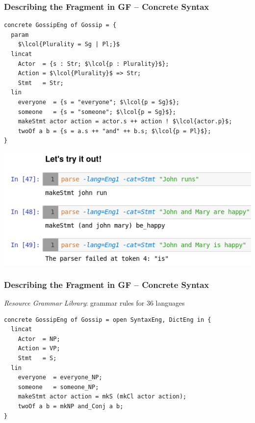 \documentclass[dvipsnames]{beamer}
\def\GF{\textsf{GF}\xspace}
\def\lcol#1{\textbf{\textcolor{NavyBlue}{#1}}}      %
\begin{document}
\begin{frame}[fragile]
    \frametitle{Describing the Fragment in \GF{} -- Concrete Syntax}

    \begin{lstlisting}[language=GF]
concrete GossipEng of Gossip = {
  param
    $\lcol{Plurality = Sg | Pl;}$
  lincat
    Actor  = {s : Str; $\lcol{p : Plurality}$};
    Action = $\lcol{Plurality}$ => Str;
    Stmt   = Str;
  lin
    everyone  = {s = "everyone"; $\lcol{p = Sg}$};
    someone   = {s = "someone"; $\lcol{p = Sg}$};
    makeStmt actor action = actor.s ++ action ! $\lcol{actor.p}$;
    twoOf a b = {s = a.s ++ "and" ++ b.s; $\lcol{p = Pl}$};
}
    \end{lstlisting}

    \includegraphics[scale=0.38]{screenshot_eng1.png}
\end{frame}

\begin{frame}[fragile]
    \frametitle{Describing the Fragment in \GF{} -- Concrete Syntax}
    \emph{Resource Grammar Library}: grammar rules for 36 languages

    \begin{lstlisting}[language=GF]
concrete GossipEng of Gossip = open SyntaxEng, DictEng in {
  lincat
    Actor  = NP;
    Action = VP;
    Stmt   = S;
  lin
    everyone  = everyone_NP;
    someone   = someone_NP;
    makeStmt actor action = mkS (mkCl actor action);
    twoOf a b = mkNP and_Conj a b;
}
    \end{lstlisting}
\end{frame}
\end{document}
